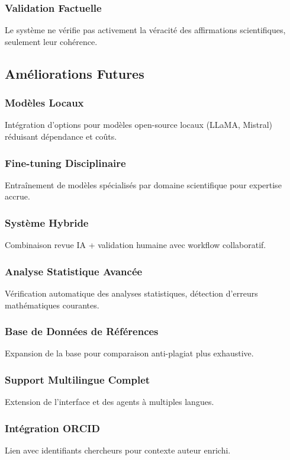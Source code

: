 \documentclass[12pt,a4paper]{article}
\begin{document}
\subsubsection{Validation Factuelle}
Le système ne vérifie pas activement la véracité des affirmations scientifiques, seulement leur cohérence.

\subsection{Améliorations Futures}

\subsubsection{Modèles Locaux}
Intégration d'options pour modèles open-source locaux (LLaMA, Mistral) réduisant dépendance et coûts.

\subsubsection{Fine-tuning Disciplinaire}
Entraînement de modèles spécialisés par domaine scientifique pour expertise accrue.

\subsubsection{Système Hybride}
Combinaison revue IA + validation humaine avec workflow collaboratif.

\subsubsection{Analyse Statistique Avancée}
Vérification automatique des analyses statistiques, détection d'erreurs mathématiques courantes.

\subsubsection{Base de Données de Références}
Expansion de la base pour comparaison anti-plagiat plus exhaustive.

\subsubsection{Support Multilingue Complet}
Extension de l'interface et des agents à multiples langues.

\subsubsection{Intégration ORCID}
Lien avec identifiants chercheurs pour contexte auteur enrichi.
\end{document}
